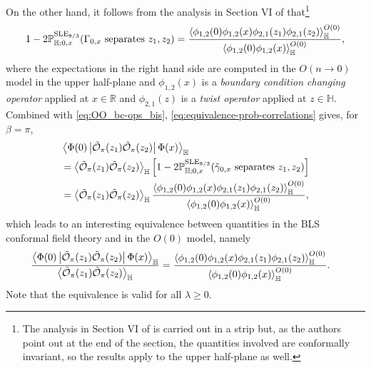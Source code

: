 \documentclass[a4paper,11pt]{article}
\begin{document}
On the other hand, it follows from the analysis in Section VI of \cite{Simmons_2009} that\footnote{The analysis in Section VI of \cite{Simmons_2009} is carried out in a strip but, as the authors point out at the end of the section, the quantities involved are conformally invariant, so the results apply to the upper half-plane as well.}
\begin{align}
\begin{split} \label{eq:equivalence-prob-correlations}
    1-2\mathbb{P}^{\text{SLE}_{8/3}}_{\mathbb{H};0,x}(\Gamma_{0,x} \text{ separates } z_1,z_2) = \frac{\Braket{\phi_{1,2}(0) \phi_{1,2}(x) \phi_{2,1}(z_1) \phi_{2,1}(z_2)}^{O(0)}_{\mathbb{H}}}{\Braket{\phi_{1,2}(0) \phi_{1,2}(x)}^{O(0)}_{\mathbb{H}}},
\end{split}
\end{align}
where the expectations in the right hand side are computed in the $O(n \to 0)$ model in the upper half-plane and $\phi_{1,2}(x)$ is a \emph{boundary condition changing operator} applied at $x \in \mathbb{R}$ and $\phi_{2,1}(z)$ is a \emph{twist operator} applied at $z \in \mathbb{H}$. Combined with \eqref{eq:OO_bc-ops_bis}, \eqref{eq:equivalence-prob-correlations} gives, for $\beta=\pi$,
\begin{align} \label{eq:OO_bc-ops_tris}
\begin{split}
    & \Braket{\Phi(0) \left\vert \tilde{\mathcal{O}}_{\pi}(z_1) \tilde{\mathcal{O}}_{\pi}(z_2) \right\vert \Phi(x)}_{\mathbb{H}} \\
    &= \Braket{\tilde{\mathcal{O}}_{\pi}(z_1) \tilde{\mathcal{O}}_{\pi}(z_2)}_{\mathbb{H}} \left[ 1 - 2 \mathbb{P}^{\text{SLE}_{8/3}}_{\mathbb{H};0,x}(\tilde{\gamma}_{0,x} \text{ separates } z_1,z_2) \right] \\
    &= \Braket{\tilde{\mathcal{O}}_{\pi}(z_1) \tilde{\mathcal{O}}_{\pi}(z_2)}_{\mathbb{H}} \frac{\Braket{\phi_{1,2}(0) \phi_{1,2}(x) \phi_{2,1}(z_1) \phi_{2,1}(z_2)}^{O(0)}_{\mathbb{H}}}{\Braket{\phi_{1,2}(0) \phi_{1,2}(x)}^{O(0)}_{\mathbb{H}}},
\end{split}
\end{align}
which leads to an interesting equivalence between quantities in the BLS conformal field theory and in the $O(0)$ model, namely
\begin{align} \label{eq:equivalence}
\begin{split}
    & \frac{\Braket{\Phi(0) \left\vert \tilde{\mathcal{O}}_{\pi}(z_1) \tilde{\mathcal{O}}_{\pi}(z_2) \right\vert \Phi(x)}_{\mathbb{H}}}{\Braket{\tilde{\mathcal{O}}_{\pi}(z_1) \tilde{\mathcal{O}}_{\pi}(z_2)}_{\mathbb{H}}} = \frac{\Braket{\phi_{1,2}(0) \phi_{1,2}(x) \phi_{2,1}(z_1) \phi_{2,1}(z_2)}^{O(0)}_{\mathbb{H}}}{\Braket{\phi_{1,2}(0) \phi_{1,2}(x)}^{O(0)}_{\mathbb{H}}}.
\end{split}
\end{align}
Note that the equivalence is valid for all $\lambda\geq0$.
\end{document}
